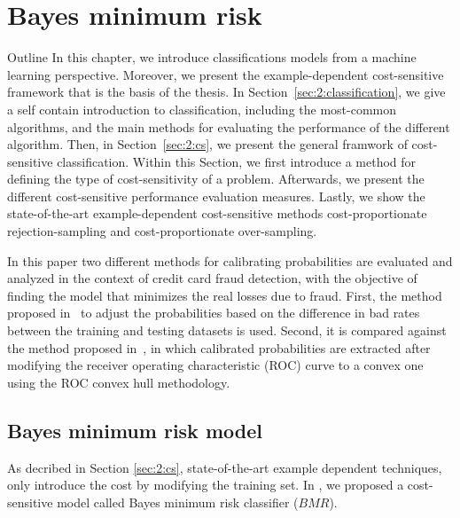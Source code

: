 \chapter{Bayes minimum risk}

\begin{remark}{Outline}
In this chapter, we introduce classifications models from a machine learning perspective. 
Moreover, we present the example-dependent cost-sensitive framework that is the basis of the 
thesis. In Section~\ref{sec:2:classification}, we give a self contain introduction to 
classification, including the most-common algorithms, and the main methods for evaluating the 
performance of the different algorithm. Then, in Section~\ref{sec:2:cs}, we present the general 
framwork of cost-sensitive classification. Within this Section, we first introduce a method for 
defining the type of cost-sensitivity of a problem. Afterwards, we present the different 
cost-sensitive performance evaluation measures. Lastly, we show the state-of-the-art 
example-dependent cost-sensitive methods cost-proportionate rejection-sampling and 
cost-proportionate over-sampling.
\end{remark}


  In this paper two different methods for calibrating probabilities are evaluated and analyzed in 
the context
  of credit card fraud detection, with the objective of finding the model that minimizes the real 
losses due to fraud.
  First, the method proposed \mbox{in \citep{Elkan2001}} to adjust the probabilities based on the 
difference in
  bad rates between the training and testing datasets is used.
  Second, it is compared against the method proposed \mbox{in \citep{Hernandez-Orallo2012}},
  in which calibrated probabilities are extracted after modifying the receiver operating 
characteristic (ROC) curve
  to a convex one using the ROC convex hull methodology.
  
\section{Bayes minimum risk model}

As decribed in Section \ref{sec:2:cs}, state-of-the-art example dependent techniques, only 
introduce the cost by modifying the training set. In \citep{CorreaBahnsen2013,CorreaBahnsen2014}, 
we proposed a cost-sensitive model called Bayes minimum risk classifier ($BMR$).  

